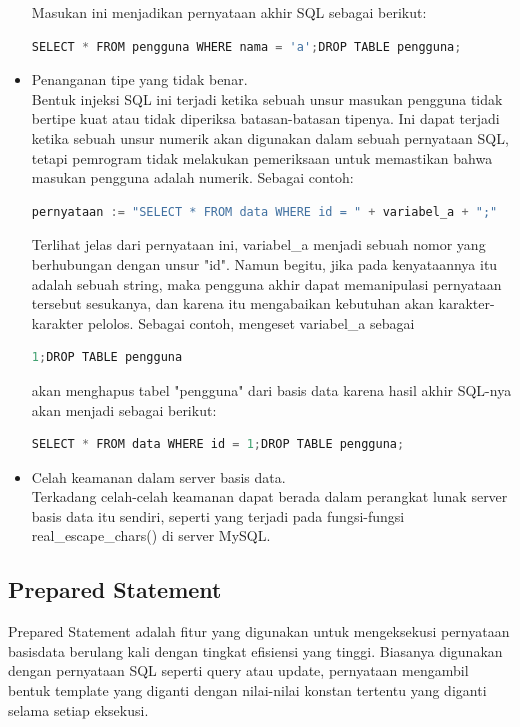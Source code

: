 \begin{itemize}
	Masukan ini menjadikan pernyataan akhir SQL sebagai berikut:

	\begin{lstlisting}[language=Java]
		SELECT * FROM pengguna WHERE nama = 'a';DROP TABLE pengguna; 
	\end{lstlisting}
	\item Penanganan tipe yang tidak benar.\\
	Bentuk injeksi SQL ini terjadi ketika sebuah unsur masukan pengguna tidak bertipe kuat atau tidak diperiksa batasan-batasan tipenya. Ini dapat terjadi ketika sebuah unsur numerik akan digunakan dalam sebuah pernyataan SQL, tetapi pemrogram tidak melakukan pemeriksaan untuk memastikan bahwa masukan pengguna adalah numerik. Sebagai contoh:
	
	\begin{lstlisting}[language=Java]
		pernyataan := "SELECT * FROM data WHERE id = " + variabel_a + ";"
	\end{lstlisting}
	
	Terlihat jelas dari pernyataan ini, variabel\_a menjadi sebuah nomor yang berhubungan dengan unsur "id". Namun begitu, jika pada kenyataannya itu adalah sebuah string, maka pengguna akhir dapat memanipulasi pernyataan tersebut sesukanya, dan karena itu mengabaikan kebutuhan akan karakter-karakter pelolos. Sebagai contoh, mengeset variabel\_a sebagai

	\begin{lstlisting}[language=Java]
		1;DROP TABLE pengguna
	\end{lstlisting}
	akan menghapus tabel "pengguna" dari basis data karena hasil akhir SQL-nya akan menjadi sebagai berikut:
	\begin{lstlisting}[language=Java]
		SELECT * FROM data WHERE id = 1;DROP TABLE pengguna;
	\end{lstlisting}
	
	\item Celah keamanan dalam server basis data.\\
	Terkadang celah-celah keamanan dapat berada dalam perangkat lunak server basis data itu sendiri, seperti yang terjadi pada fungsi-fungsi real\_escape\_chars() di server MySQL.
\end{itemize}

\subsection{Prepared Statement}
Prepared Statement adalah fitur yang digunakan untuk mengeksekusi pernyataan basisdata berulang kali dengan tingkat efisiensi yang tinggi.  Biasanya digunakan dengan pernyataan SQL seperti query atau update, pernyataan mengambil bentuk template yang diganti dengan nilai-nilai konstan tertentu yang diganti selama setiap eksekusi.

